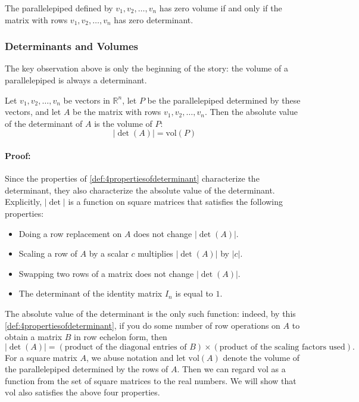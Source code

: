 \documentclass[a4paper,12pt]{article}
\begin{document}
\begin{tcolorbox}[title=Key Observation,colframe=blue!70!black, colback=blue!5!white]
The parallelepiped defined by \( v_1, v_2, \dots, v_n \) has zero volume if and only if the matrix with rows \( v_1, v_2, \dots, v_n \) has zero determinant.
\end{tcolorbox}
\subsubsection{Determinants and Volumes}The key observation above is only the beginning of the story: the volume of a parallelepiped is always a determinant.

\begin{tcolorbox}[title=Theorem(Determinants and volumes),colframe=blue!70!black, colback=blue!5!white]
Let \( v_1, v_2, \dots, v_n \) be vectors in \( \mathbb{R}^n \), let \( P \) be the parallelepiped determined by these vectors, and let \( A \) be the matrix with rows \( v_1, v_2, \dots, v_n \). Then the absolute value of the determinant of \( A \) is the volume of \( P \):
\[
| \det(A) | = \text{vol}(P)
\]
\end{tcolorbox}
\paragraph{Proof:} Since the properties of \ref{def:4propertiesofdeterminant} characterize the determinant, they also characterize the absolute value of the determinant. Explicitly, \( |\det| \) is a function on square matrices that satisfies the following properties:
\begin{itemize}
    \item Doing a row replacement on \( A \) does not change \( |\det(A)| \).
    \item Scaling a row of \( A \) by a scalar \( c \) multiplies \( |\det(A)| \) by \( |c| \).
    \item Swapping two rows of a matrix does not change \( |\det(A)| \).
    \item The determinant of the identity matrix \( I_n \) is equal to \( 1 \).
\end{itemize}

The absolute value of the determinant is the only such function: indeed, by this \ref{def:4propertiesofdeterminant}, if you do some number of row operations on \( A \) to obtain a matrix \( B \) in row echelon form, then
\[
| \det(A) | = \left( \text{product of the diagonal entries of } B \right) \times \left( \text{product of the scaling factors used} \right).
\]
For a square matrix \( A \), we abuse notation and let \( \text{vol}(A) \) denote the volume of the parallelepiped determined by the rows of \( A \). Then we can regard \( \text{vol} \) as a function from the set of square matrices to the real numbers. We will show that \( \text{vol} \) also satisfies the above four properties.
\end{document}
